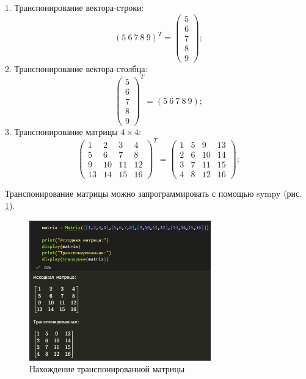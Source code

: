 \documentclass[14pt,a4paper]{extarticle}
\begin{document}
1. Транспонирование вектора-строки:
\[
(5\ 6\ 7\ 8\ 9)^T = \begin{pmatrix} 5 \\ 6 \\ 7 \\ 8 \\ 9 \end{pmatrix};\]
2. Транспонирование вектора-столбца:
\[
\begin{pmatrix}
5 \\
6 \\
7 \\
8 \\
9
\end{pmatrix}^T = (5\ 6\ 7\ 8\ 9);\]
3. Транспонирование матрицы $4\times4$:
\[
\begin{pmatrix}
1 & 2 & 3 & 4 \\
5 & 6 & 7 & 8 \\
9 & 10 & 11 & 12 \\
13 & 14 & 15 & 16
\end{pmatrix}^T = 
\begin{pmatrix}
1 & 5 & 9 & 13 \\
2 & 6 & 10 & 14 \\
3 & 7 & 11 & 15 \\
4 & 8 & 12 & 16
\end{pmatrix};
\]

Транспонирование матрицы можно запрограммировать с помощью sympy (рис. \ref{pic:trans}).

\begin{figure}[h!]
    \centering
    \includegraphics[width=0.7\textwidth]{figures/transp.png}
    \caption{Нахождение транспонированной матрицы}
    \label{pic:trans}
\end{figure}
\end{document}
